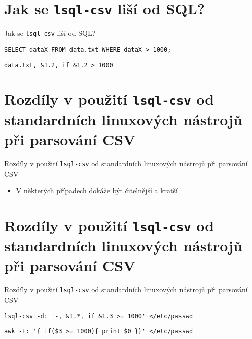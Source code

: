 \documentclass{beamer}
\def\icode#1{\texttt{#1}}
\begin{document}
\section{Jak se \icode{lsql-csv} liší od SQL?}
\begin{frame}[fragile]{Jak se \icode{lsql-csv} liší od SQL?}
\begin{verbatim}
SELECT dataX FROM data.txt WHERE dataX > 1000;
\end{verbatim}

\vskip 1cm

\begin{verbatim}
data.txt, &1.2, if &1.2 > 1000
\end{verbatim}

\end{frame}


\section{Rozdíly v použití \icode{lsql-csv} od standardních linuxových nástrojů při parsování CSV}
\begin{frame}[fragile]{Rozdíly v použití \icode{lsql-csv} od standardních linuxových nástrojů při parsování CSV}
\begin{itemize}
\item V některých případech dokáže být čitelnější a kratší
\end{itemize}
\end{frame}


\section{Rozdíly v použití \icode{lsql-csv} od standardních linuxových nástrojů při parsování CSV}
\begin{frame}[fragile]{Rozdíly v použití \icode{lsql-csv} od standardních linuxových nástrojů při parsování CSV}

\begin{verbatim}
lsql-csv -d: '-, &1.*, if &1.3 >= 1000' </etc/passwd
\end{verbatim}

\vskip 1cm

\begin{verbatim}
awk -F: '{ if($3 >= 1000){ print $0 }}' </etc/passwd
\end{verbatim}
\end{frame}
\end{document}
